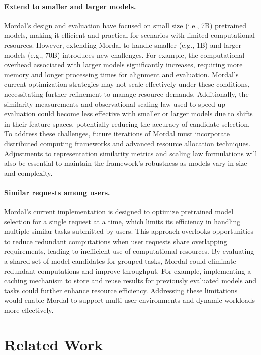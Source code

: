 \paragraph{Extend to smaller and larger models.} Mordal's design and evaluation have focused on small size (i.e., 7B) pretrained models, making it efficient and practical for scenarios with limited computational resources. However, extending Mordal to handle smaller (e.g., 1B) and larger models (e.g., 70B) introduces new challenges. For example, the computational overhead associated with larger models significantly increases, requiring more memory and longer processing times for alignment and evaluation. Mordal's current optimization strategies may not scale effectively under these conditions, necessitating further refinement to manage resource demands. Additionally, the similarity measurements and observational scaling law used to speed up evaluation could become less effective with smaller or larger models due to shifts in their feature spaces, potentially reducing the accuracy of candidate selection. To address these challenges, future iterations of Mordal must incorporate distributed computing frameworks and advanced resource allocation techniques. Adjustments to representation similarity metrics and scaling law formulations will also be essential to maintain the framework's robustness as models vary in size and complexity.

\paragraph{Similar requests among users.} Mordal's current implementation is designed to optimize pretrained model selection for a single request at a time, which limits its efficiency in handling multiple similar tasks submitted by users. This approach overlooks opportunities to reduce redundant computations when user requests share overlapping requirements, leading to inefficient use of computational resources. By evaluating a shared set of model candidates for grouped tasks, Mordal could eliminate redundant computations and improve throughput. For example, implementing a caching mechanism to store and reuse results for previously evaluated models and tasks could further enhance resource efficiency. Addressing these limitations would enable Mordal to support multi-user environments and dynamic workloads more effectively.


\section{Related Work}
